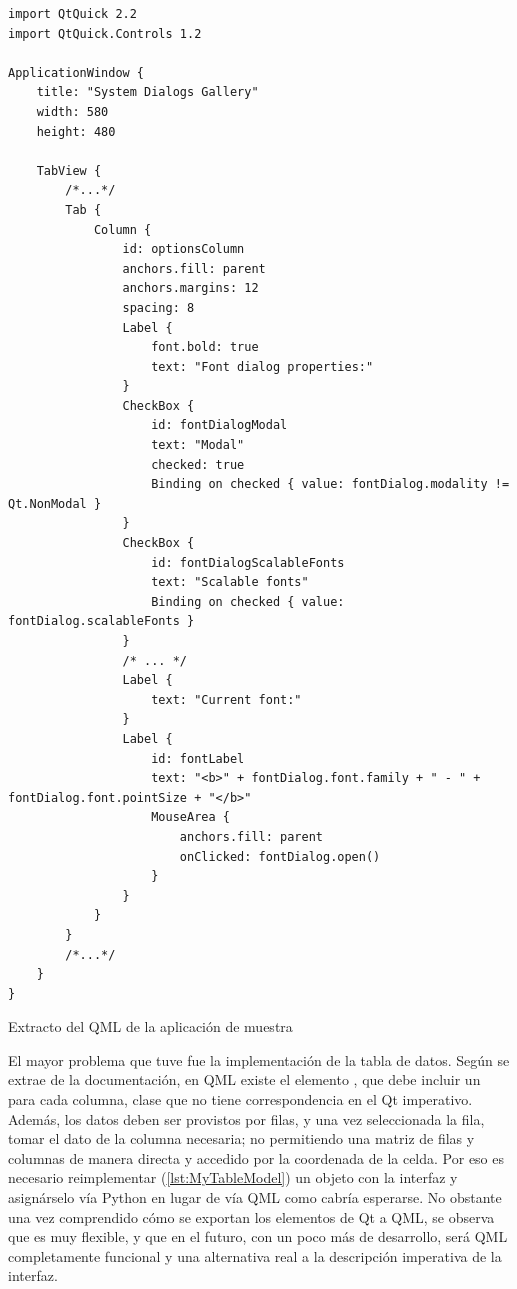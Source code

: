 \begin{listing}[phtb]
\begin{verbatim}
import QtQuick 2.2
import QtQuick.Controls 1.2

ApplicationWindow {
    title: "System Dialogs Gallery"
    width: 580
    height: 480

    TabView {
        /*...*/
        Tab {
            Column {
                id: optionsColumn
                anchors.fill: parent
                anchors.margins: 12
                spacing: 8
                Label {
                    font.bold: true
                    text: "Font dialog properties:"
                }
                CheckBox {
                    id: fontDialogModal
                    text: "Modal"
                    checked: true
                    Binding on checked { value: fontDialog.modality != Qt.NonModal }
                }
                CheckBox {
                    id: fontDialogScalableFonts
                    text: "Scalable fonts"
                    Binding on checked { value: fontDialog.scalableFonts }
                }
                /* ... */
                Label {
                    text: "Current font:"
                }
                Label {
                    id: fontLabel
                    text: "<b>" + fontDialog.font.family + " - " + fontDialog.font.pointSize + "</b>"
                    MouseArea {
                        anchors.fill: parent
                        onClicked: fontDialog.open()
                    }
                }
            }            
        }
        /*...*/
    }
}
\end{verbatim}
\caption{Extracto del QML de la aplicación de muestra}
\label{lst:qml-extract}
\end{listing}


El mayor problema que tuve fue la implementación de la tabla de datos. Según se extrae de la documentación, en QML existe el elemento , que debe incluir un  para cada columna, clase que no tiene correspondencia en el Qt imperativo. Además, los datos deben ser provistos por filas, y una vez seleccionada la fila, tomar el dato de la columna necesaria; no permitiendo una matriz de filas y columnas de manera directa y accedido por la coordenada de la celda. Por eso es necesario reimplementar (\autoref{lst:MyTableModel}) un objeto con la interfaz  y asignárselo vía Python en lugar de vía QML como cabría esperarse. No obstante una vez comprendido cómo se exportan los elementos de Qt a QML, se observa que es muy flexible, y que en el futuro, con un poco más de desarrollo, será QML completamente funcional y una alternativa real a la descripción imperativa de la interfaz.

